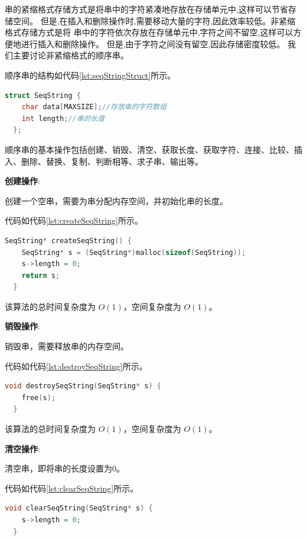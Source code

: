 \documentclass[lang=cn,newtx,10pt,scheme=chinese]{../elegantbook}
\begin{document}
串的紧缩格式存储方式是将串中的字符紧凑地存放在存储单元中,这样可以节省存储空间。
但是,在插入和删除操作时,需要移动大量的字符,因此效率较低。非紧缩格式存储方式是将 串中的字符依次存放在存储单元中,字符之间不留空,这样可以方便地进行插入和删除操作。
但是,由于字符之间没有留空,因此存储密度较低。
我们主要讨论非紧缩格式的顺序串。

顺序串的结构如代码\ref{lst:seqStringStruct}所示。

\begin{lstlisting}[language=C++, caption={顺序串结构体定义}, label={lst:seqStringStruct}]
  struct SeqString {
    char data[MAXSIZE];//存放串的字符数组
    int length;//串的长度
  };
\end{lstlisting}

顺序串的基本操作包括创建、销毁、清空、获取长度、获取字符、连接、比较、插入、删除、替换、复制、判断相等、求子串、输出等。

\textbf{创建操作}:

创建一个空串，需要为串分配内存空间，并初始化串的长度。

代码如代码\ref{lst:createSeqString}所示。

\begin{lstlisting}[language=C++, caption={创建一个空串示例代码}, label={lst:createSeqString}]
  SeqString* createSeqString() {
    SeqString* s = (SeqString*)malloc(sizeof(SeqString));
    s->length = 0;
    return s;
  }

\end{lstlisting}

该算法的总时间复杂度为 $O(1)$，空间复杂度为 $O(1)$。


\textbf{销毁操作}:

销毁串，需要释放串的内存空间。

代码如代码\ref{lst:destroySeqString}所示。

\begin{lstlisting}[language=C++, caption={销毁串示例代码}, label={lst:destroySeqString}]
  void destroySeqString(SeqString* s) {
    free(s);
  }

\end{lstlisting}

该算法的总时间复杂度为 $O(1)$，空间复杂度为 $O(1)$。


\textbf{清空操作}:

清空串，即将串的长度设置为0。

代码如代码\ref{lst:clearSeqString}所示。

\begin{lstlisting}[language=C++, caption={清空串示例代码}, label={lst:clearSeqString}]
  void clearSeqString(SeqString* s) {
    s->length = 0;
  }

\end{lstlisting}
\end{document}
